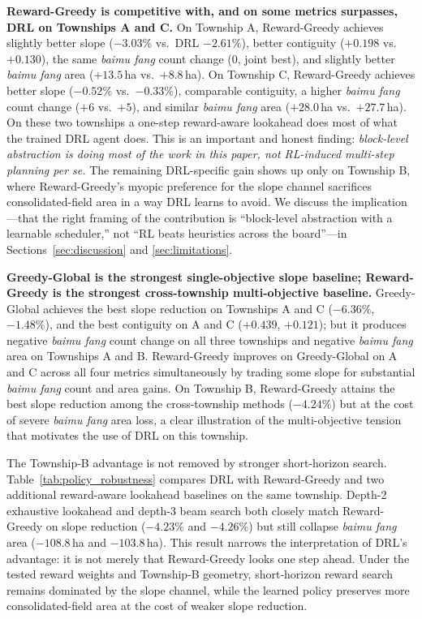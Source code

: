\documentclass[preprint,12pt]{elsarticle}
\begin{document}
\textbf{Reward-Greedy is competitive with, and on some metrics surpasses, DRL on Townships A and C.} On Township A, Reward-Greedy achieves slightly better slope ($-3.03\%$ vs.\ DRL $-2.61\%$), better contiguity ($+0.198$ vs.\ $+0.130$), the same \textit{baimu fang} count change ($0$, joint best), and slightly better \textit{baimu fang} area ($+13.5$\,ha vs.\ $+8.8$\,ha). On Township C, Reward-Greedy achieves better slope ($-0.52\%$ vs.\ $-0.33\%$), comparable contiguity, a higher \textit{baimu fang} count change ($+6$ vs.\ $+5$), and similar \textit{baimu fang} area ($+28.0$\,ha vs.\ $+27.7$\,ha). On these two townships a one-step reward-aware lookahead does most of what the trained DRL agent does. This is an important and honest finding: \textit{block-level abstraction is doing most of the work in this paper, not RL-induced multi-step planning per se.} The remaining DRL-specific gain shows up only on Township B, where Reward-Greedy's myopic preference for the slope channel sacrifices consolidated-field area in a way DRL learns to avoid. We discuss the implication---that the right framing of the contribution is ``block-level abstraction with a learnable scheduler,'' not ``RL beats heuristics across the board''---in Sections~\ref{sec:discussion} and \ref{sec:limitations}.

\textbf{Greedy-Global is the strongest single-objective slope baseline; Reward-Greedy is the strongest cross-township multi-objective baseline.} Greedy-Global achieves the best slope reduction on Townships A and C ($-6.36\%$, $-1.48\%$), and the best contiguity on A and C ($+0.439$, $+0.121$); but it produces negative \textit{baimu fang} count change on all three townships and negative \textit{baimu fang} area on Townships A and B. Reward-Greedy improves on Greedy-Global on A and C across all four metrics simultaneously by trading some slope for substantial \textit{baimu fang} count and area gains. On Township B, Reward-Greedy attains the best slope reduction among the cross-township methods ($-4.24\%$) but at the cost of severe \textit{baimu fang} area loss, a clear illustration of the multi-objective tension that motivates the use of DRL on this township.

The Township-B advantage is not removed by stronger short-horizon search. Table~\ref{tab:policy_robustness} compares DRL with Reward-Greedy and two additional reward-aware lookahead baselines on the same township. Depth-2 exhaustive lookahead and depth-3 beam search both closely match Reward-Greedy on slope reduction ($-4.23\%$ and $-4.26\%$) but still collapse \textit{baimu fang} area ($-108.8$\,ha and $-103.8$\,ha). This result narrows the interpretation of DRL's advantage: it is not merely that Reward-Greedy looks one step ahead. Under the tested reward weights and Township-B geometry, short-horizon reward search remains dominated by the slope channel, while the learned policy preserves more consolidated-field area at the cost of weaker slope reduction.
\end{document}

